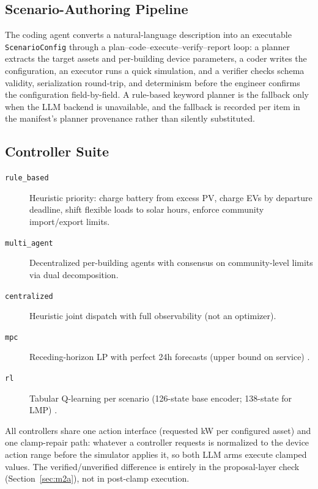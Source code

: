 \documentclass[11pt,a4paper]{article}
\newcommand{\agent}[1]{\texttt{#1}}
\begin{document}
\subsection{Scenario-Authoring Pipeline}
The coding agent converts a natural-language description into an executable
\texttt{ScenarioConfig} through a plan--code--execute--verify--report loop:
a planner extracts the target assets and per-building device parameters, a
coder writes the configuration, an executor runs a quick simulation, and a
verifier checks schema validity, serialization round-trip, and determinism
before the engineer confirms the configuration field-by-field. A rule-based
keyword planner is the fallback only when the LLM backend is unavailable, and
the fallback is recorded per item in the manifest's planner provenance rather
than silently substituted.

\subsection{Controller Suite}
\begin{description}
    \item[\agent{rule\_based}] Heuristic priority: charge battery from excess PV, charge EVs by departure deadline, shift flexible loads to solar hours, enforce community import/export limits.
    \item[\agent{multi\_agent}] Decentralized per-building agents with consensus on community-level limits via dual decomposition.
    \item[\agent{centralized}] Heuristic joint dispatch with full observability (not an optimizer).
    \item[\agent{mpc}] Receding-horizon LP with perfect 24h forecasts (upper bound on service) \cite{mpc2020}.
    \item[\agent{rl}] Tabular Q-learning per scenario (126-state base encoder; 138-state for LMP) \cite{acmenergy2022}.
\end{description}

All controllers share one action interface (requested kW per configured asset)
and one clamp-repair path: whatever a controller requests is normalized to the
device action range before the simulator applies it, so both LLM arms execute
clamped values. The verified/unverified difference is entirely in the
proposal-layer check (Section~\ref{sec:m2a}), not in post-clamp execution.
\end{document}
